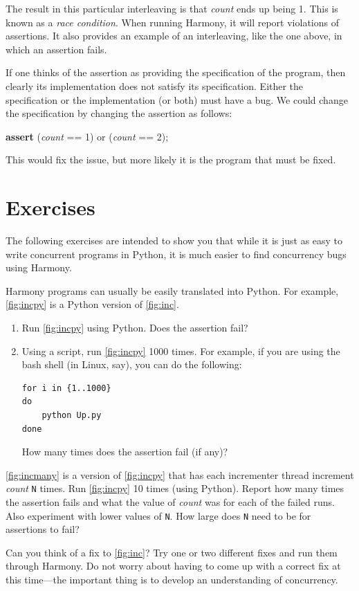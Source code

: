 \documentclass{report}
\newenvironment{code}{
\tcolorbox
}{
\endtcolorbox
}
\begin{document}
The result in this particular interleaving is that \textit{count} ends up
being 1.
This is known as a \emph{race condition}.
%
When running Harmony, it will
report violations of assertions.  It also provides an example
of an interleaving, like the one above, in which an assertion fails.

%

If one thinks of the assertion as providing the specification of the
program, then clearly its implementation does not satisfy its specification.
Either the specification or the implementation (or both) must have a bug.
We could change the specification by changing the assertion as follows:

\begin{code}
\textbf{assert} (\textit{count} == 1) or (\textit{count} == 2);
\end{code}

This would fix the issue, but more likely it is the program that must
be fixed.

\section*{Exercises}

The following exercises are intended to show you that while it is just
as easy to write concurrent programs in Python, it is much easier to
find concurrency bugs using Harmony.

\begin{problems}
\item Harmony programs can usually be easily translated into Python.  For example,
\autoref{fig:incpy} is a Python version of \autoref{fig:inc}.
\begin{enumerate}
\item Run \autoref{fig:incpy} using Python.  Does the assertion fail?
\item Using a script, run \autoref{fig:incpy} 1000 times.
For example, if you are using the bash shell (in Linux, say), you can do the following:
\begin{code}
\begin{verbatim}
for i in {1..1000}
do
    python Up.py
done
\end{verbatim}
\end{code}
How many times does the assertion fail (if any)?
\end{enumerate}
\item \autoref{fig:incmany} is a version of \autoref{fig:incpy} that has each
incrementer thread increment \textit{count} \texttt{N} times.  Run \autoref{fig:incpy}
10 times (using Python).
Report how many times the assertion fails and what the value of \textit{count}
was for each of the failed runs.
Also experiment with lower values of \texttt{N}.
How large does \texttt{N} need to be for assertions to fail?
\item Can you think of a fix to \autoref{fig:inc}?  Try one or two different fixes
and run them through Harmony.  Do not worry about having to come up with a correct fix at this
time---the important thing is to develop an understanding of concurrency.
\end{problems}
\end{document}
